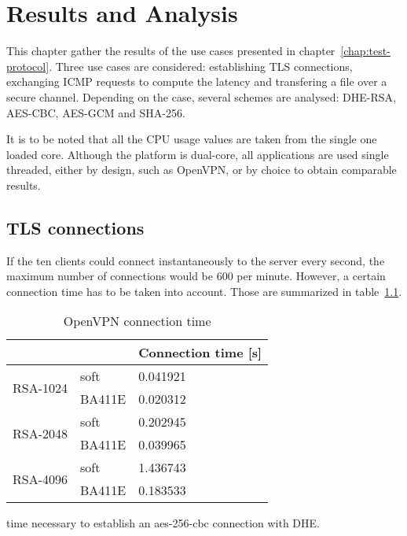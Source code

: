 \chapter{Results and Analysis}\label{chap:results}

This chapter gather the results of the use cases presented in chapter~\ref{chap:test-protocol}.
Three use cases are considered: establishing TLS connections, exchanging ICMP requests to compute the latency and transfering a file over a secure channel.
Depending on the case, several schemes are analysed: DHE-RSA, AES-CBC, AES-GCM and SHA-256.

It is to be noted that all the CPU usage values are taken from the single one loaded core.
Although the platform is dual-core, all applications are used single threaded, either by design, such as OpenVPN, or by choice to obtain comparable results.

\section{TLS connections}

If the ten clients could connect instantaneously to the server every second, the maximum number of connections would be 600 per minute.
However, a certain connection time has to be taken into account.
Those are summarized in table~\ref{tab:openvpn-con-time}.

\begin{table}[ht]
\center
\small
\begin{tabular}{ll|l|} \cline{3-3}
 & & Connection time [s] \\ \hline
\multicolumn{1}{|l|}{\multirow{2}{*}{RSA-1024}} & soft & 0.041921 \\ \cline{2-3}
\multicolumn{1}{|l|}{} & BA411E & 0.020312 \\ \hline
\multicolumn{1}{|l|}{\multirow{2}{*}{RSA-2048}} & soft & 0.202945 \\ \cline{2-3}
\multicolumn{1}{|l|}{} & BA411E & 0.039965 \\ \hline
\multicolumn{1}{|l|}{\multirow{2}{*}{RSA-4096}} & soft & 1.436743 \\ \cline{2-3}
\multicolumn{1}{|l|}{} & BA411E & 0.183533 \\ \hline
\end{tabular}
\caption{OpenVPN connection time}{time necessary to establish an aes-256-cbc connection with DHE.}
\label{tab:openvpn-con-time}
\end{table}

